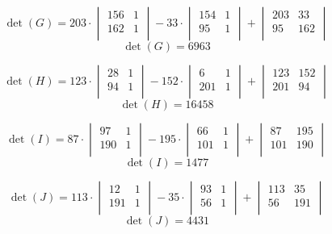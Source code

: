 \documentclass[12pft, english]{article}
\begin{document}
\begin{multicols}{2}
  \[
    \det(G) =
    203 \cdot
    \begin{vmatrix}
      156 & 1 \\
      162 & 1 \\
    \end{vmatrix}
    -
    33 \cdot
    \begin{vmatrix}
      154 & 1 \\
      95 & 1 \\
    \end{vmatrix}
    +
    \begin{vmatrix}
      203 & 33 \\
      95 & 162 \\
    \end{vmatrix}
  \]
  \[
    \det(G) = 6963
  \]

  \[
    \det(H) =
    123 \cdot
    \begin{vmatrix}
      28 & 1 \\
      94 & 1 \\
    \end{vmatrix}
    -
    152 \cdot
    \begin{vmatrix}
      6 & 1 \\
      201 & 1 \\
    \end{vmatrix}
    +
    \begin{vmatrix}
      123 & 152 \\
      201 & 94 \\
    \end{vmatrix}
  \]
  \[
    \det(H) = 16458
  \]

  \[
    \det(I) =
    87 \cdot
    \begin{vmatrix}
      97 & 1 \\
      190 & 1 \\
    \end{vmatrix}
    -
    195 \cdot
    \begin{vmatrix}
      66 & 1 \\
      101 & 1 \\
    \end{vmatrix}
    +
    \begin{vmatrix}
      87 & 195 \\
      101 & 190 \\
    \end{vmatrix}
  \]
  \[
    \det(I) = 1477
  \]

  \[
    \det(J) =
    113 \cdot
    \begin{vmatrix}
      12 & 1 \\
      191 & 1 \\
    \end{vmatrix}
    -
    35 \cdot
    \begin{vmatrix}
      93 & 1 \\
      56 & 1 \\
    \end{vmatrix}
    +
    \begin{vmatrix}
      113 & 35 \\
      56 & 191 \\
    \end{vmatrix}
  \]
  \[
    \det(J) = 4431
  \]


\end{multicols}
\end{document}
